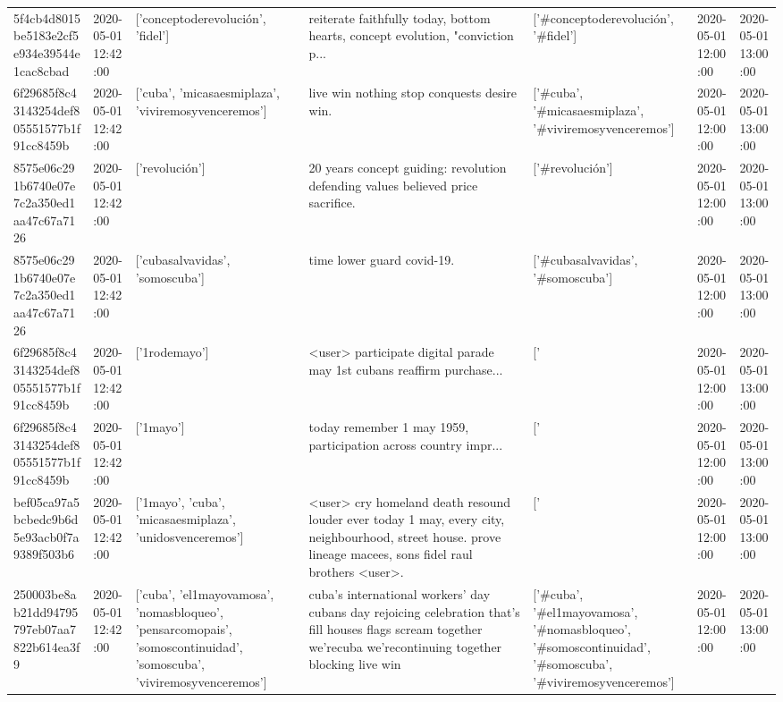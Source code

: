 \begin{tabular}{lllllll}
5f4cb4d8015be5183e2cf5e934e39544e1cac8cbad & 2020-05-01 12:42:00 & ['conceptoderevolución', 'fidel'] & reiterate faithfully today, bottom hearts, concept evolution, "conviction p... & ['#conceptoderevolución', '#fidel'] & 2020-05-01 12:00:00 & 2020-05-01 13:00:00 \\
6f29685f8c43143254def805551577b1f91cc8459b & 2020-05-01 12:42:00 & ['cuba', 'micasaesmiplaza', 'viviremosyvenceremos'] & live win nothing stop conquests desire win. & ['#cuba', '#micasaesmiplaza', '#viviremosyvenceremos'] & 2020-05-01 12:00:00 & 2020-05-01 13:00:00 \\
8575e06c291b6740e07e7c2a350ed1aa47c67a7126 & 2020-05-01 12:42:00 & ['revolución'] & 20 years concept guiding: revolution defending values believed price sacrifice. & ['#revolución'] & 2020-05-01 12:00:00 & 2020-05-01 13:00:00 \\
8575e06c291b6740e07e7c2a350ed1aa47c67a7126 & 2020-05-01 12:42:00 & ['cubasalvavidas', 'somoscuba'] & time lower guard covid-19. & ['#cubasalvavidas', '#somoscuba'] & 2020-05-01 12:00:00 & 2020-05-01 13:00:00 \\
6f29685f8c43143254def805551577b1f91cc8459b & 2020-05-01 12:42:00 & ['1rodemayo'] & <user> participate digital parade may 1st cubans reaffirm purchase... & ['#1rodemayo'] & 2020-05-01 12:00:00 & 2020-05-01 13:00:00 \\
6f29685f8c43143254def805551577b1f91cc8459b & 2020-05-01 12:42:00 & ['1mayo'] & today remember 1 may 1959, participation across country impr... & ['#1mayo'] & 2020-05-01 12:00:00 & 2020-05-01 13:00:00 \\
bef05ca97a5bcbedc9b6d5e93acb0f7a9389f503b6 & 2020-05-01 12:42:00 & ['1mayo', 'cuba', 'micasaesmiplaza', 'unidosvenceremos'] & <user> cry homeland death resound louder ever today 1 may, every city, neighbourhood, street house. prove lineage macees, sons fidel raul brothers <user>. & ['#1mayo', '#cuba', '#micasaesmiplaza', '#unidosvenceremos'] & 2020-05-01 12:00:00 & 2020-05-01 13:00:00 \\
250003be8ab21dd94795797eb07aa7822b614ea3f9 & 2020-05-01 12:42:00 & ['cuba', 'el1mayovamosa', 'nomasbloqueo', 'pensarcomopais', 'somoscontinuidad', 'somoscuba', 'viviremosyvenceremos'] & cuba's international workers' day cubans day rejoicing celebration that's fill houses flags scream together we'recuba we'recontinuing together blocking live win & ['#cuba', '#el1mayovamosa', '#nomasbloqueo', '#somoscontinuidad', '#somoscuba', '#viviremosyvenceremos'] & 2020-05-01 12:00:00 & 2020-05-01 13:00:00 \\

\end{tabular}
